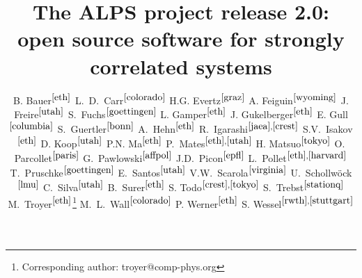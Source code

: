 \documentclass[12pt]{iopart}
\begin{document}
\title{The ALPS project release 2.0: \\ open source software for strongly correlated systems}


\newcommand{\myauthor}[3]{#2$^{#1}$}
\newcommand{\myaddress}[2]{\address{\refstepcounter{affiliation} $^{\arabic{affiliation}}$#2 \label{#1}}}

\author{
	\myauthor{\ref{eth}}{B. Bauer}{bauerb@phys.ethz.ch}
	\myauthor{\ref{colorado}}{L.~D.~Carr}{lcarr@mines.edu}
	\myauthor{\ref{graz}}{H.G. Evertz}{evertz@tugraz.at}
	\myauthor{\ref{wyoming}}{A. Feiguin}{afeiguin@uwyo.edu}
	\myauthor{\ref{utah}}{J. Freire}{juliana@cs.utah.edu}
	\myauthor{\ref{goettingen}}{S.~Fuchs}{fuchs@theorie.physik.uni-goettingen.de}
	\myauthor{\ref{eth}}{L. Gamper}{gamperl@gmail.com}
	\myauthor{\ref{eth}}{J. Gukelberger}{gukelberger@phys.ethz.ch}
	\myauthor{\ref{columbia}}{E. Gull}{gull@phys.columbia.edu}
	\myauthor{\ref{bonn}}{S.~Guertler}{guertler@th.physik.uni-bonn.de}
	\myauthor{\ref{eth}}{A.~Hehn}{hehn@phys.ethz.ch}
	\myauthor{\ref{jaea},\ref{crest}}{R.~Igarashi}{rigarash@hosi.phys.s.u-tokyo.ac.jp}
	\myauthor{\ref{eth}}{S.V.~Isakov}{isakov@phys.ethz.ch}
	\myauthor{\ref{utah}}{D. Koop}{dakoop@cs.utah.edu}
	\myauthor{\ref{eth}}{P.N. Ma}{pingnang@phys.ethz.ch}
	\myauthor{\ref{eth},\ref{utah}}{P.~Mates}{mates@sci.utah.edu}
	\myauthor{\ref{tokyo}}{H. Matsuo}{halm@looper.t.u-tokyo.ac.jp}
	\myauthor{\ref{paris}}{O. Parcollet}{parcolle@spht.saclay.cea.fr}
	\myauthor{\ref{affpol}}{G.~Pawlowski}{gpawlo@amu.edu.pl}
	\myauthor{\ref{epfl}}{J.D.~Picon}{jean-david.picon@epfl.chl}
	\myauthor{\ref{eth},\ref{harvard}}{L.~Pollet}{pollet@phys.ethz.ch}
	\myauthor{\ref{goettingen}}{T.~Pruschke}{pruschke@theorie.physik.uni-goettingen.de}
	\myauthor{\ref{utah}}{E.~Santos}{emanuele@sci.utah.edu}
	\myauthor{\ref{virginia}}{V.W.~Scarola}{scarola@vt.edu}
	\myauthor{\ref{lmu}}{U.~Schollw\"ock}{schollwoeck@lmu.de}
	\myauthor{\ref{utah}}{C.~Silva}{csilva@sci.utah.edu}
	\myauthor{\ref{eth}}{B.~Surer}{surerb@phys.ethz.ch}
	\myauthor{\ref{crest},\ref{tokyo}}{S. Todo}{wistaria@ap.t.u-tokyo.ac.jp}
	\myauthor{\ref{stationq}}{S.~Trebst}{trebst@kitp.ucsb.edu}
	\myauthor{\ref{eth}}{M.~Troyer}{troyer@ethz.ch}\footnote{Corresponding author: troyer@comp-phys.org}
	\myauthor{\ref{colorado}}{M.~L.~Wall}{mwall@mymail.mines.edu}
	\myauthor{\ref{eth}}{P. Werner}{werner@phys.ethz.ch}
	\myauthor{\ref{rwth},\ref{stuttgart}}{S. Wessel}{wessel@phys.ethz.ch}
}
\end{document}
